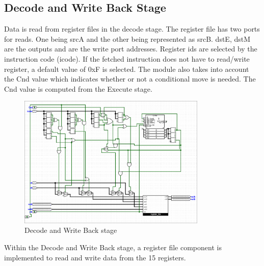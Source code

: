 \documentclass{article}
\begin{document}
\subsection{Decode and Write Back Stage}

Data is read from register files in the decode stage. 
The register file has two ports for reads. 
One being srcA and the other being represented as srcB. 
dstE, dstM are the outputs and are the write port addresses. 
Register ids are selected by the instruction code (icode). 
If the fetched instruction does not have to read/write register, a default value of 0xF is selected. 
The module also takes into account the Cnd value which indicates whether or not a conditional move is needed. 
The Cnd value is computed from the Execute stage.

\begin{figure}[H]
    \centering
    \includegraphics[width=0.8\textwidth]{./images/decode_write_back.png}
    \caption{Decode and Write Back stage}
\end{figure}

Within the Decode and Write Back stage, a register file component is implemented to read and write data from the 15 registers.
\end{document}
